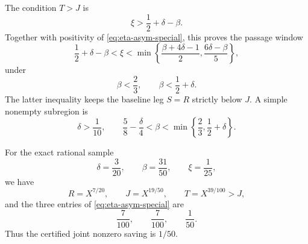 The condition \(T>J\) is
\begin{equation}
 \xi>\frac12+\delta-\beta.
 \label{eq:T-beyond-J}
\end{equation}
Together with positivity of \eqref{eq:eta-asym-special}, this proves
the passage window
\begin{equation}
 \boxed{
 \frac12+\delta-\beta<\xi<
 \min\left\{
 \frac{\beta+4\delta-1}{2},
 \frac{6\delta-\beta}{5}
 \right\},}
 \label{eq:special-passage-window}
\end{equation}
under
\begin{equation}
 \beta<\frac23,\qquad \beta<\frac12+\delta.
 \label{eq:special-beta-margins}
\end{equation}
The latter inequality keeps the baseline leg \(S=R\) strictly below
\(J\).  A simple nonempty subregion is
\begin{equation}
 \boxed{
 \delta>\frac1{10},\qquad
 \frac58-\frac\delta4<\beta<
 \min\left\{\frac23,\frac12+\delta\right\}.}
 \label{eq:special-nonempty-region}
\end{equation}

For the exact rational sample
\begin{equation}
 \delta=\frac3{20},\qquad
 \beta=\frac{31}{50},\qquad
 \xi=\frac1{25},
 \label{eq:rational-passage-sample}
\end{equation}
we have
\[
 R=X^{7/20},\qquad J=X^{19/50},\qquad
 T=X^{39/100}>J,
\]
and the three entries of \eqref{eq:eta-asym-special} are
\[
 \frac7{100},\qquad\frac7{100},\qquad\frac1{50}.
\]
Thus the certified joint nonzero saving is \(1/50\).
